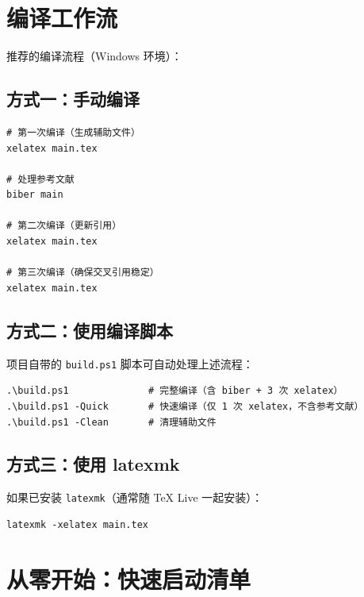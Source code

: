 \section{编译工作流}


推荐的编译流程（Windows 环境）：

\subsection{方式一：手动编译}

\begin{lstlisting}[style=kaolstplain]
# 第一次编译（生成辅助文件）
xelatex main.tex

# 处理参考文献
biber main

# 第二次编译（更新引用）
xelatex main.tex

# 第三次编译（确保交叉引用稳定）
xelatex main.tex
\end{lstlisting}

\subsection{方式二：使用编译脚本}

项目自带的 \texttt{build.ps1} 脚本可自动处理上述流程：

\begin{lstlisting}[style=kaolstplain]
.\build.ps1              # 完整编译（含 biber + 3 次 xelatex）
.\build.ps1 -Quick       # 快速编译（仅 1 次 xelatex，不含参考文献）
.\build.ps1 -Clean       # 清理辅助文件
\end{lstlisting}

\subsection{方式三：使用 latexmk}

如果已安装 \texttt{latexmk}（通常随 TeX Live 一起安装）：

\begin{lstlisting}[style=kaolstplain]
latexmk -xelatex main.tex
\end{lstlisting}


\section{从零开始：快速启动清单}

